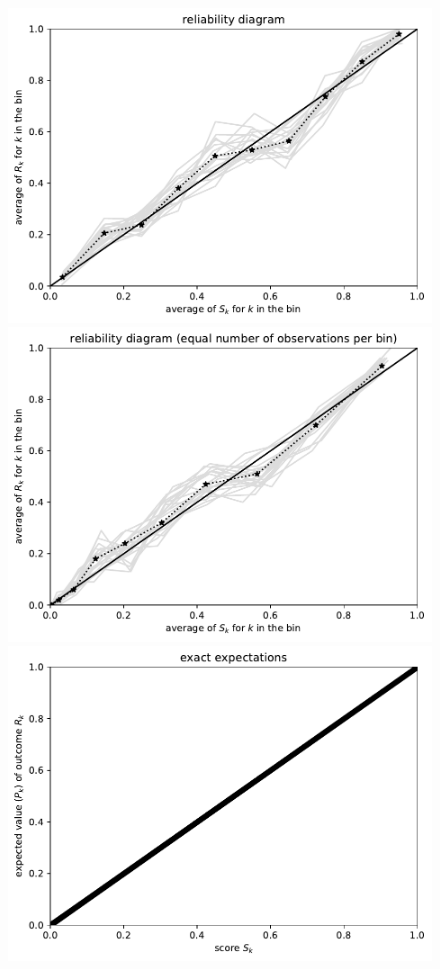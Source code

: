 \documentclass{article}
\begin{document}
\begin{figure}
\begin{centering}
\parbox{\imsize}{\includegraphics[width=\imsize]
                {./codes/unweighted/1000_10_1_3/equiprob.pdf}}
\quad\quad
\parbox{\imsize}{\includegraphics[width=\imsize]
                {./codes/unweighted/1000_10_1_3/equisamp.pdf}}

\vspace{\vertsep}

\parbox{\imsize}{\includegraphics[width=\imsize]
                {./codes/unweighted/1000_10_1_3/exact.pdf}}


\end{centering}
\end{figure}
\end{document}
